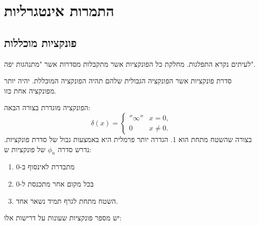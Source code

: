 \documentclass{tstextbook}
\begin{document}
\chapter{התמרות אינטגרליות}

\section{פונקציות מוכללות}

\begin{definition}
לעיתים נקרא התפלגות. מחלקת כל הפונקציות אשר מתקבלות מסדרות אשר "מתנהגות יפה".

\end{definition}
\begin{definition}
סדרת פונקציות אשר הפונקציה הגבולית שלהם תהיה הפונקציה המוכללת. יהיה יותר מפונקציה אחת כזו.

\end{definition}
\begin{definition}
הפונקציה מוגדרת בצורה הבאה:
$$ \delta(x)=\left\{\begin{matrix}''\infty''&x=0,\\0&x\ne0.\end{matrix}\right.$$
בצורה שהשטח מתחת הוא 1.
הגדרה יותר פרמלית היא באמצעות גבול של סדרת פונקציות. נדרש סדרה \(\phi_{n}\) של פונקציות ש:

  \begin{enumerate}
    \item מתבדרת לאינסוף ב-0 


    \item בכל מקום אחר מתכנסת ל-0  


    \item השטח מתחת לגרף תמיד נשאר אחד. 


  \end{enumerate}
\end{definition}
יש מספר פונקציות שעונות על דרישות אלו:
\end{document}
